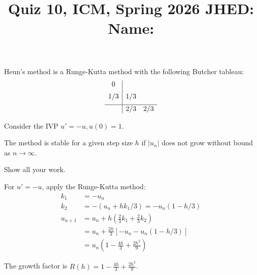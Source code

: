 \documentclass[reqno]{exam}
\title{\normalsize{Quiz 10, ICM, Spring 2026 \hspace{1ex} JHED: \underline{\hspace{20ex}} \hspace{2ex} Name: \underline{\hspace{40ex}}}}
\author{}
\date{}
\begin{document}
\maketitle
\vspace{-2cm} %

\begin{questions}
\question[10]
  Heun's method is a Runge-Kutta method with the following Butcher tableau:
\begin{equation*}
            \begin{array}{c|cc}
              0   &      &     \\[0.5em]
              1/3   & 1/3  &     \\[0.5em]
              \hline
                  & 2/3 & 2/3 \\
            \end{array}
\end{equation*}

Consider the IVP $u' = -u, u(0) = 1$.

The method is stable for a given step size $h$ if $|u_n|$ does not grow without bound as $n \to \infty$.


Show all your work.

\begin{solution}
For $u' = -u$, apply the Runge-Kutta method:
\begin{align*}
k_1 &= -u_n \\
k_2 &= -(u_n + hk_1/3) = -u_n(1 - h/3) \\
u_{n+1} &= u_n + h\left(\frac{2}{3}k_1 + \frac{2}{3}k_2\right) \\
&= u_n + \frac{2h}{3}[-u_n - u_n(1-h/3)] \\
&= u_n\left(1 - \frac{4h}{3} + \frac{2h^2}{9}\right)
\end{align*}

The growth factor is $R(h) = 1 - \frac{4h}{3} + \frac{2h^2}{9}$.


\end{solution}
\end{questions}
\end{document}
